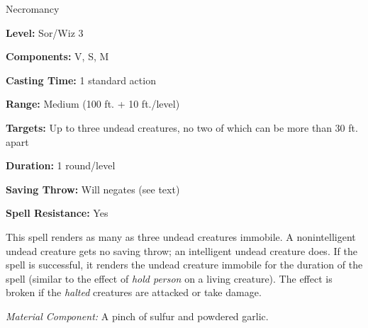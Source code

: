 
Necromancy

\textbf{Level:} Sor/Wiz 3

\textbf{Components:} V, S, M

\textbf{Casting Time:} 1 standard action

\textbf{Range:} Medium (100 ft. + 10 ft./level)

\textbf{Targets:} Up to three undead creatures, no two of which can be more than 
30 ft. apart

\textbf{Duration:} 1 round/level

\textbf{Saving Throw:} Will negates (see text)

\textbf{Spell Resistance:} Yes

This spell renders as many as three undead creatures immobile. A nonintelligent 
undead creature gets no saving throw; an intelligent undead creature does. If the 
spell is successful, it renders the undead creature immobile for the duration of 
the spell (similar to the effect of \textit{hold person} on a living creature). 
The effect is broken if the \textit{halted} creatures are attacked or take damage.

\textit{Material Component:} A pinch of sulfur and powdered garlic.

